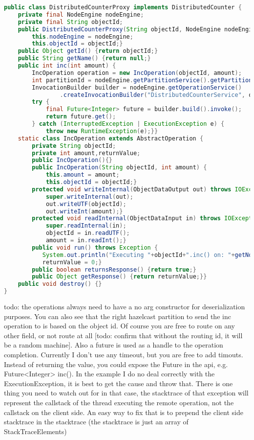 \begin{lstlisting}[language=java]
public class DistributedCounterProxy implements DistributedCounter {
    private final NodeEngine nodeEngine;
    private final String objectId;
    public DistributedCounterProxy(String objectId, NodeEngine nodeEngine) {
        this.nodeEngine = nodeEngine;
        this.objectId = objectId;}
    public Object getId() {return objectId;}
    public String getName() {return null;}
    public int inc(int amount) {
        IncOperation operation = new IncOperation(objectId, amount);
        int partitionId = nodeEngine.getPartitionService().getPartitionId(objectId);
        InvocationBuilder builder = nodeEngine.getOperationService()
                .createInvocationBuilder("DistributedCounterService", operation, partitionId);
        try {
            final Future<Integer> future = builder.build().invoke();
            return future.get();
        } catch (InterruptedException | ExecutionException e) {
            throw new RuntimeException(e);}}
    static class IncOperation extends AbstractOperation {
        private String objectId;
        private int amount,returnValue;
        public IncOperation(){}
        public IncOperation(String objectId, int amount) {
            this.amount = amount;
            this.objectId = objectId;}
        protected void writeInternal(ObjectDataOutput out) throws IOException {
            super.writeInternal(out);
            out.writeUTF(objectId);
            out.writeInt(amount);}
        protected void readInternal(ObjectDataInput in) throws IOException {
            super.readInternal(in);
            objectId = in.readUTF();
            amount = in.readInt();}
        public void run() throws Exception {
           System.out.println("Executing "+objectId+".inc() on: "+getNodeEngine().getThisAddress());            
           returnValue = 0;}
        public boolean returnsResponse() {return true;}
        public Object getResponse() {return returnValue;}}
    public void destroy() {}
}
\end{lstlisting}
todo: the operations always need to have a no arg constructor for deserialization purposes. You can also see that the right hazelcast partition to send the inc operation to is based on the object id. Of course you are free to route on any other field, or not route at all [todo: confirm that without the routing id, it will be a random machine]. Also a future is used as a handle to the operation completion. Currently I don't use any timeout, but you are free to add timouts. Instead of returning the value, you could expose the Future in the api, e.g. Future<Integer> inc(). In the example I do no deal correctly with the ExecutionException, it is best to get the cause and throw that. There is one thing you need to watch out for in that case, the stacktrace of that exception will represent the callstack of the thread executing the remote operation, not the callstack on the client side. An easy way to fix that is to prepend  the client side stacktrace in the stacktrace (the stacktrace is just an array of StackTraceElements)

